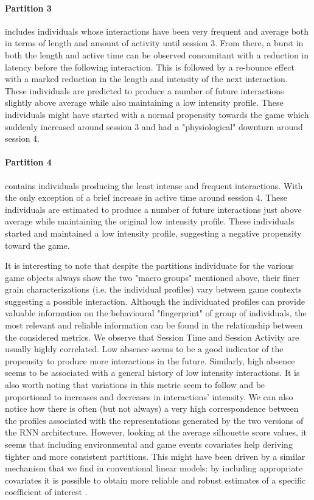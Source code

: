 \paragraph*{\textbf{Partition 3}} includes individuals whose interactions have been very frequent and average both in terms of length and amount of activity until session 3. From there, a burst in both the length and active time can be observed concomitant with a reduction in latency before the following interaction. This is followed by a re-bounce effect with a marked reduction in the length and intensity of the next interaction. These individuals are predicted to produce a number of future interactions slightly above average while also maintaining a low intensity profile. These individuals might have started with a normal propensity towards the game which suddenly increased around session 3 and had a "physiological" downturn around session 4. 

\paragraph*{\textbf{Partition 4}} contains individuals producing the least intense and frequent interactions. With the only exception of a brief increase in active time around session 4. These individuals are estimated to produce a number of future interactions just above average while maintaining the original low intensity profile. These individuals started and maintained a low intensity profile, suggesting a negative propensity toward the game. 

It is interesting to note that despite the partitions individuate for the various game objects always show the two "macro groups" mentioned above, their finer grain characterizations (i.e. the individual profiles) vary between game contexts suggesting a possible interaction. Although the individuated profiles can provide valuable information on the behavioural "fingerprint" of group of individuals, the most relevant and reliable information can be found in the relationship between the considered metrics. We observe that Session Time and Session Activity are usually highly correlated. Low absence seems to be a good indicator of the propensity to produce more interactions in the future. Similarly, high absence seems to be associated with a general history of low intensity interactions. It is also worth noting that variations in this metric seem to follow and be proportional to increases and decreases in interactions' intensity. We can also notice how there is often (but not always) a very high correspondence between the profiles associated with the representations generated by the two versions of the RNN architecture. However, looking at the average silhouette score values, it seems that including environmental and game events covariates help deriving tighter and more consistent partitions. This might have been driven by a similar mechanism that we find in conventional linear models: by including appropriate covariates it is possible to obtain more reliable and robust estimates of a specific coefficient of interest \cite{gelman2020regression}.

